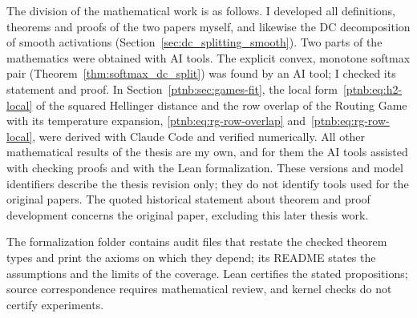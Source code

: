 The division of the mathematical work is as follows. I developed all definitions, theorems and proofs of the two papers myself, and likewise the DC decomposition of smooth activations (Section~\ref{sec:dc_splitting_smooth}). Two parts of the mathematics were obtained with AI tools. The explicit convex, monotone softmax pair (Theorem~\ref{thm:softmax_dc_split}) was found by an AI tool; I checked its statement and proof. In Section~\ref{ptnb:sec:games-fit}, the local form~\eqref{ptnb:eq:h2-local} of the squared Hellinger distance and the row overlap of the Routing Game with its temperature expansion, \eqref{ptnb:eq:rg-row-overlap} and~\eqref{ptnb:eq:rg-row-local}, were derived with Claude Code and verified numerically. All other mathematical results of the thesis are my own, and for them the AI tools assisted with checking proofs and with the Lean formalization. These versions and model identifiers describe the thesis revision only; they do not identify tools used for the original papers. The quoted historical statement about theorem and proof development concerns the original paper, excluding this later thesis work.

The formalization folder contains audit files that restate the checked theorem types and print the axioms on which they depend; its README states the assumptions and the limits of the coverage. Lean certifies the stated propositions; source correspondence requires mathematical review, and kernel checks do not certify experiments.
